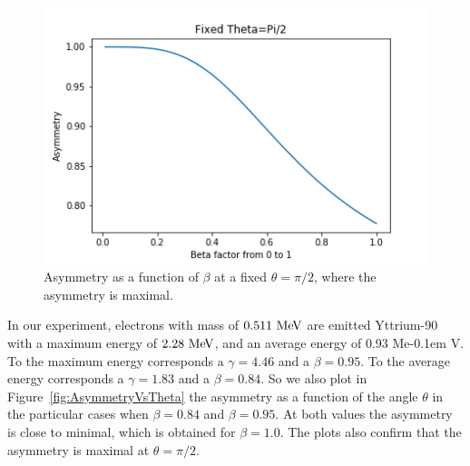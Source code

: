 \documentclass[10pt,swedish, openany]{book}
\def\MeV{\ifmmode {\mathrm{\ Me\kern -0.1em V}}\else
                   \textrm{Me\kern -0.1em V}\fi}%
\begin{document}
\begin{figure}[H]
\includegraphics[scale=0.5]{Asymmetry_vs_Beta.png}
\centering
\caption{Asymmetry as a function of $\beta$ at a fixed $\theta=\pi/2$, where the asymmetry is maximal.}
\label{fig:AsymmetryVsBeta}
\end{figure}

In our experiment, electrons with mass of $0.511 \MeV$ are emitted Yttrium-90 with a maximum energy of $2.28 \MeV$, and an average energy of 0.93 \MeV. To the maximum energy corresponds a $\gamma=4.46$ and a $\beta=0.95$. To the average energy corresponds a $\gamma=1.83$ and a $\beta=0.84$. So we also plot in Figure~\ref{fig:AsymmetryVsTheta} the asymmetry as a function of the angle $\theta$ in the particular cases when $\beta=0.84$ and $\beta=0.95$. At both values the asymmetry is close to minimal, which is obtained for $\beta=1.0$. The plots also confirm that the asymmetry is maximal at $\theta=\pi/2$. 
\end{document}
